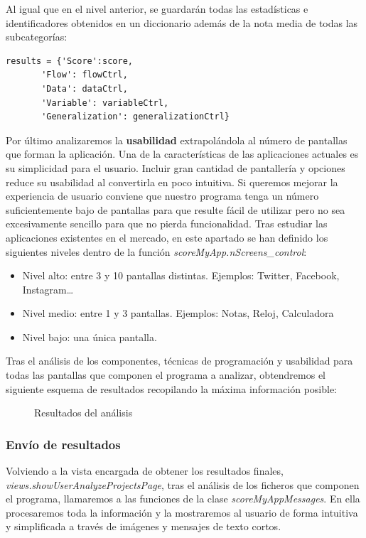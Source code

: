 \documentclass[a4paper, 12pt]{book}
\begin{document}
Al igual que en el nivel anterior, se guardarán todas las estadísticas e identificadores obtenidos en un diccionario además de la nota media de todas las subcategorías:
\begin{lstlisting}
results = {'Score':score,
       'Flow': flowCtrl,
       'Data': dataCtrl,
       'Variable': variableCtrl,
       'Generalization': generalizationCtrl}
\end{lstlisting}

Por último analizaremos la \textbf{usabilidad} extrapolándola al número de pantallas que forman la aplicación. Una de la características de las aplicaciones actuales es su simplicidad para el usuario. Incluir gran cantidad de pantallería y opciones reduce su usabilidad al convertirla en poco intuitiva. Si queremos mejorar la experiencia de usuario conviene que nuestro programa tenga un número suficientemente bajo de pantallas para que resulte fácil de utilizar pero no sea excesivamente sencillo para que no pierda funcionalidad. Tras estudiar las aplicaciones existentes en el mercado, en este apartado se han definido los siguientes niveles dentro de la función \textit{scoreMyApp.nScreens\_control}:
\begin{itemize}
	\item Nivel alto: entre 3 y 10 pantallas distintas. Ejemplos: Twitter, Facebook, Instagram\ldots
	\item Nivel medio: entre 1 y 3 pantallas. Ejemplos: Notas, Reloj, Calculadora
	\item Nivel bajo: una única pantalla.  
\end{itemize}

Tras el análisis de los componentes, técnicas de programación y usabilidad para todas las pantallas que componen el programa a analizar, obtendremos el siguiente esquema de resultados recopilando la máxima información posible:
\begin{figure}[H]
  \caption{Resultados del análisis}
  \label{fig:scoreAppInventor}
\end{figure}
\subsubsection{Envío de resultados}
Volviendo a la vista encargada de obtener los resultados finales, \textit{views.showUserAnalyzeProjectsPage}, tras el análisis de los ficheros que componen el programa, llamaremos a las funciones de la clase \textit{scoreMyAppMessages}. En ella procesaremos toda la información y la mostraremos al usuario de forma intuitiva y simplificada a través de imágenes y mensajes de texto cortos. 
 
\end{document}
